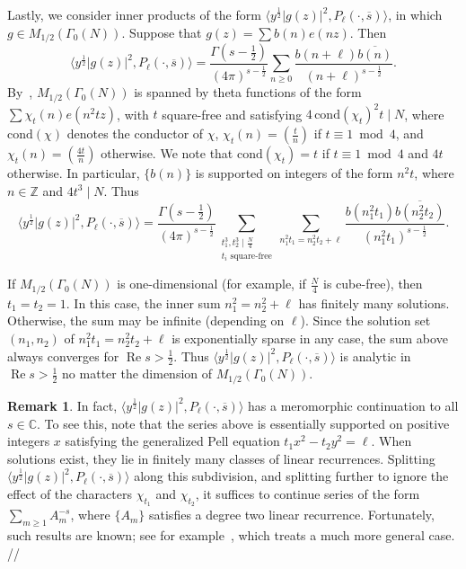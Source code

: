 \documentclass[11pt,reqno]{amsart}
\theoremstyle{plain}
\theoremstyle{definition}
\newtheorem{remark}[theorem]{Remark}
\numberwithin{equation}{section}
\renewcommand{\Re}{\operatorname{Re}}
\begin{document}
Lastly, we consider inner products of the form $\langle y^\frac{1}{2} \vert g(z) \vert^2, P_\ell(\cdot, \overline{s}) \rangle$, in which $g \in M_{1/2}(\Gamma_0(N))$. Suppose that $g(z) = \sum b(n) e(nz)$.  Then
\[
	\langle y^\frac{1}{2} \vert g(z) \vert^2, P_\ell(\cdot, \overline{s}) \rangle
	= \frac{\Gamma(s-\frac{1}{2})}{(4\pi)^{s-\frac{1}{2}}}
		\sum_{n \geq 0} \frac{b(n+\ell)\overline{b(n)}}{(n+\ell)^{s-\frac{1}{2}}}.
\]
By~\cite[Theorem A]{SerreStark77}, $M_{1/2}(\Gamma_0(N))$ is spanned by theta functions of the form $\sum \chi_t(n) e(n^2 t z)$, with $t$ square-free and satisfying $4 \,\mathrm{cond}(\chi_t)^2 t \mid N$, where $\mathrm{cond}(\chi)$ denotes the conductor of $\chi$, $\chi_t(n) = (\frac{t}{n})$ if $t \equiv 1 \bmod 4$, and $\chi_t(n) = (\frac{4t}{n})$ otherwise. We note that $\mathrm{cond}(\chi_t) = t$ if $t \equiv 1 \bmod 4$ and $4t$ otherwise.  In particular, $\{b(n)\}$ is supported on integers of the form $n^2 t$, where $n \in \mathbb{Z}$ and $4t^3 \mid N$. Thus
\[
	\langle y^\frac{1}{2} \vert g(z) \vert^2, P_\ell(\cdot, \overline{s}) \rangle
	= \frac{\Gamma(s-\frac{1}{2})}{(4\pi)^{s-\frac{1}{2}}}
		\sum_{\substack{t_1^3, t_2^3 \mid \frac{N}{4} \\ t_i \text{ square-free}}}
		\sum_{n_1^2 t_1 = n_2^2 t_2 + \ell} 
				\frac{b(n_1^2t_1)\overline{b(n_2^2 t_2)}}{(n_1^2t_1)^{s-\frac{1}{2}}}.
\]

If $M_{1/2}(\Gamma_0(N))$ is one-dimensional (for example, if $\frac{N}{4}$ is cube-free), then $t_1 = t_2=1$. In this case, the inner sum $n_1^2 = n_2^2 + \ell$ has finitely many solutions. Otherwise, the sum may be infinite (depending on $\ell$). Since the solution set $(n_1,n_2)$ of $n_1^2 t_1 = n_2^2 t_2 + \ell$ is exponentially sparse in any case, the sum above always converges for $\Re s > \frac{1}{2}$. Thus $\langle y^\frac{1}{2} \vert g(z) \vert^2, P_\ell(\cdot, \overline{s}) \rangle$ is analytic in $\Re s > \frac{1}{2}$ no matter the dimension of $M_{1/2}(\Gamma_0(N))$.

\begin{remark} \label{rem:theta-shift-continuation}
In fact, $\langle y^\frac{1}{2} \vert g(z) \vert^2, P_\ell(\cdot, \overline{s}) \rangle$ has a meromorphic continuation to all $s \in \mathbb{C}$. To see this, note that the series above is essentially supported on positive integers $x$ satisfying the generalized Pell equation $t_1 x^2 - t_2 y^2 = \ell$. When solutions exist, they lie in finitely many classes of linear recurrences. Splitting $\langle y^\frac{1}{2} \vert g(z) \vert^2, P_\ell(\cdot, \overline{s}) \rangle$ along this subdivision, and splitting further to ignore the effect of the characters $\chi_{t_1}$ and $\chi_{t_2}$, it suffices to continue series of the form $\sum_{m \geq 1} A_m^{-s}$, where $\{A_m\}$ satisfies a degree two linear recurrence. Fortunately, such results are known; see for example~\cite{HolgadoVicente23}, which treats a much more general case. \hfill //
\end{remark}
\end{document}
